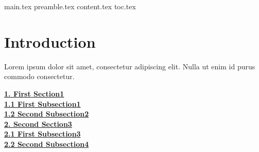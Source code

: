 main.tex         %
preamble.tex     %
content.tex      %
toc.tex          %

\section{Introduction}
Lorem ipsum dolor sit amet, consectetur adipiscing elit. Nulla ut enim id purus commodo consectetur.

\noindent\hyperref[sec:first]{\textbf{\large 1. First Section}}\dotfill\hyperref[sec:first]{\textbf{\large 1}}\\ 
\vspace{0.2cm}
\hspace*{0.5cm}\hyperref[sub:first]{\textbf{1.1 First Subsection}}\dotfill\hyperref[sub:first]{\textbf{1}}\\ 
\vspace{0.2cm}
\hspace*{0.5cm}\hyperref[sub:second]{\textbf{1.2 Second Subsection}}\dotfill\hyperref[sub:second]{\textbf{2}}\\ 
\vspace{0.5cm}
\noindent\hyperref[sec:second]{\textbf{\large 2. Second Section}}\dotfill\hyperref[sec:second]{\textbf{\large 3}}\\ 
\vspace{0.2cm}
\hspace*{0.5cm}\hyperref[sub:third]{\textbf{2.1 First Subsection}}\dotfill\hyperref[sub:third]{\textbf{3}}\\ 
\vspace{0.2cm}
\hspace*{0.5cm}\hyperref[sub:fourth]{\textbf{2.2 Second Subsection}}\dotfill\hyperref[sub:fourth]{\textbf{4}}



